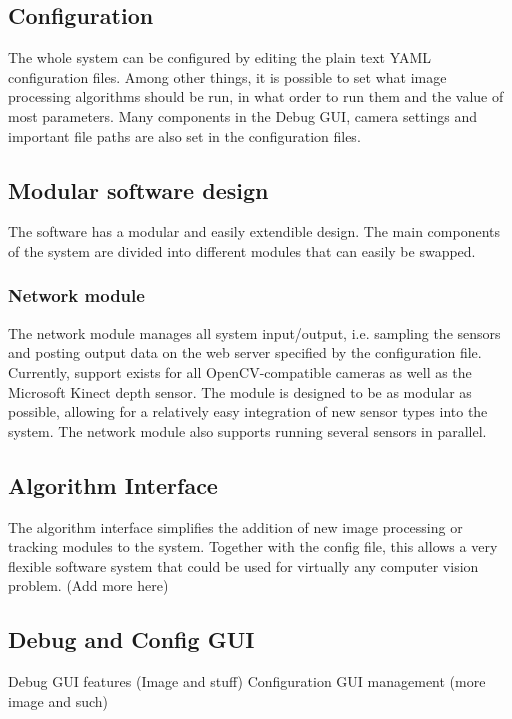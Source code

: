\subsection{Configuration}
The whole system can be configured by editing the plain text YAML configuration files. Among other things, it is possible to set what image processing algorithms should be run, in what order to run them and the value of most parameters. Many components in the Debug GUI, camera settings and important file paths are also set in the configuration files. 

\subsection{Modular software design}
The software has a modular and easily extendible design. The main components of the system are divided into different modules that can easily be swapped. 

\subsubsection{Network module}
The network module manages all system input/output, i.e. sampling the sensors and posting output data on the web server specified by the configuration file. Currently, support exists for all OpenCV-compatible cameras as well as the Microsoft Kinect depth sensor. The module is designed to be as modular as possible, allowing for a relatively easy integration of new sensor types into the system. The network module also supports running several sensors in parallel. 

\subsection{Algorithm Interface}
The algorithm interface simplifies the addition of new image processing or tracking modules to the system. Together with the config file, this allows a very flexible software system that could be used for virtually any computer vision problem. (Add more here)

\subsection{Debug and Config GUI}
Debug GUI features (Image and stuff)
Configuration GUI management (more image and such)
